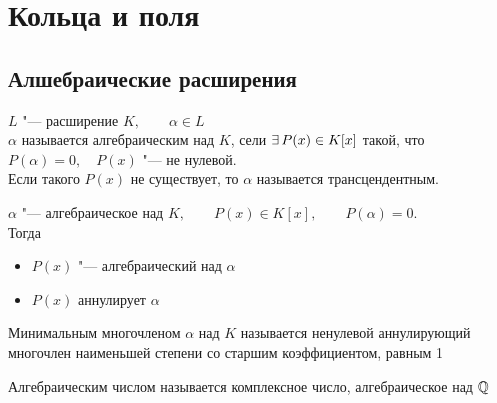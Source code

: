 \chapter{Кольца и поля}

\section{Алшебраические расширения}

\begin{definition}
	$ L $ "--- расширение $ K, \qquad \alpha \in L $ \\
	$ \alpha $ называется алгебраическим над $ K $, сели $ \exists\, P(x) \in K[x] $ такой, что $ P(\alpha) = 0, \quad P(x) $ "--- не нулевой. \\
	Если такого $ P(x) $ не существует, то $ \alpha $ называется трансцендентным.
\end{definition}

\begin{definition}
	$ \alpha $ "--- алгебраическое над $ K, \qquad P(x) \in K[x], \qquad P(\alpha) = 0 $. \\
	Тогда
	\begin{itemize}
		\item $ P(x) $ "--- алгебраический над $ \alpha $
		\item $ P(x) $ аннулирует $ \alpha $
	\end{itemize}
	Минимальным многочленом $ \alpha $ над $ K $ называется ненулевой аннулирующий многочлен наименьшей степени со старшим коэффициентом, равным 1
\end{definition}

\begin{definition}
	Алгебраическим числом называется комплексное число, алгебраическое над $ \mathbb{Q} $
\end{definition}

